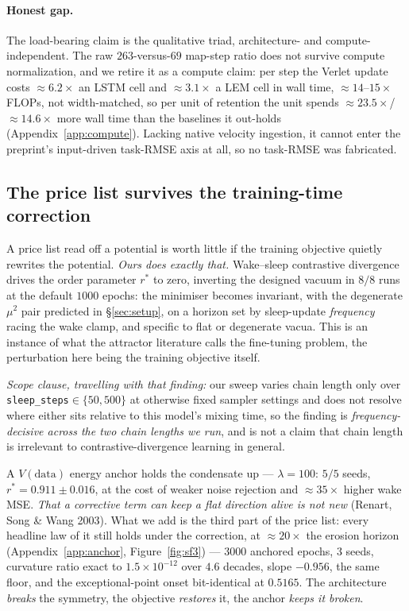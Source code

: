 \documentclass{article}
\begin{document}
\paragraph{Honest gap.} The load-bearing claim is the qualitative triad, architecture- and compute-independent. The raw $263$-versus-$69$ map-step ratio does not survive compute normalization, and we retire it as a compute claim: per step the Verlet update costs $\approx6.2\times$ an LSTM cell and $\approx3.1\times$ a LEM cell in wall time, $\approx14$--$15\times$ FLOPs, not width-matched, so per unit of retention the unit spends $\approx23.5\times$/$\approx14.6\times$ more wall time than the baselines it out-holds (Appendix~\ref{app:compute}). Lacking native velocity ingestion, it cannot enter the preprint's input-driven task-RMSE axis at all, so no task-RMSE was fabricated.

\subsection{The price list survives the training-time correction}\label{sec:cure}

A price list read off a potential is worth little if the training objective quietly rewrites the potential. \emph{Ours does exactly that.} Wake--sleep contrastive divergence drives the order parameter $r^*$ to zero, inverting the designed vacuum in $8/8$ runs at the default $1000$ epochs: the minimiser becomes invariant, with the degenerate $\mu^2$ pair predicted in \S\ref{sec:setup}, on a horizon set by sleep-update \emph{frequency} racing the wake clamp, and specific to flat or degenerate vacua. This is an instance of what the attractor literature calls the fine-tuning problem, the perturbation here being the training objective itself. {\emph{Scope clause, travelling with that finding:} our sweep varies chain length only over \texttt{sleep\_steps}$\in\{50,500\}$ at otherwise fixed sampler settings and does not resolve where either sits relative to this model's mixing time, so the finding is \emph{frequency-decisive across the two chain lengths we run}, and is not a claim that chain length is irrelevant to contrastive-divergence learning in general.\par} A $V(\text{data})$ energy anchor holds the condensate up --- $\lambda=100$: $5/5$ seeds, $r^*=0.911\pm0.016$, at the cost of weaker noise rejection and $\approx35\times$ higher wake MSE. \emph{That a corrective term can keep a flat direction alive is not new} (Renart, Song \& Wang 2003). What we add is the third part of the price list: every headline law of it still holds under the correction, at $\approx20\times$ the erosion horizon (Appendix~\ref{app:anchor}, Figure~\ref{fig:sf3}) --- $3000$ anchored epochs, $3$ seeds, curvature ratio exact to $1.5\!\times\!10^{-12}$ over $4.6$ decades, slope $-0.956$, the same floor, and the exceptional-point onset bit-identical at $0.5165$. The architecture \emph{breaks} the symmetry, the objective \emph{restores} it, the anchor \emph{keeps it broken}.
\end{document}

